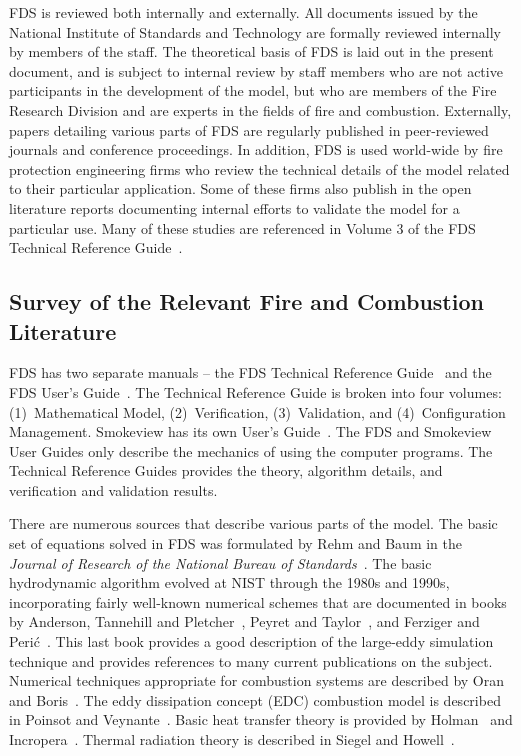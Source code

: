 \documentclass[11pt]{book}
\begin{document}
FDS is reviewed both internally and externally. All documents issued by the National Institute of Standards and Technology are formally reviewed internally by members of the staff. The theoretical basis of FDS is laid out in the present document, and is subject to internal review by staff members who are not active participants in the development of the model, but who are members of the Fire Research Division and are experts in the fields of fire and combustion. Externally, papers detailing various parts of FDS are regularly published in peer-reviewed journals and conference proceedings. In addition, FDS is used world-wide by fire protection engineering firms who review the technical details of the model related to their particular application. Some of these firms also publish in the open literature reports documenting internal efforts to validate the model for a particular use. Many of these studies are referenced in Volume 3 of the FDS Technical Reference Guide~\cite{FDS_Tech_Guide}.

\subsection{Survey of the Relevant Fire and Combustion Literature}

\label{Relevantdocs}

FDS has two separate manuals -- the FDS Technical Reference Guide~\cite{FDS_Tech_Guide} and the FDS User's Guide~\cite{FDS_Users_Guide}. The Technical Reference Guide is broken into four volumes: (1)~Mathematical Model, (2)~Verification, (3)~Validation, and (4)~Configuration Management. Smokeview has its own User's Guide~\cite{Smokeview_Users_Guide}. The FDS and Smokeview User Guides only describe the mechanics of using the computer programs. The Technical Reference Guides provides the theory, algorithm details, and verification and validation results.

There are numerous sources that describe various parts of the model. The basic set of equations solved in FDS was formulated by Rehm and Baum in the {\em Journal of Research of the National Bureau of Standards}~\cite{Rehm:1}.  The basic hydrodynamic algorithm evolved at NIST through the 1980s and 1990s, incorporating fairly well-known numerical schemes that are documented in books by Anderson, Tannehill and Pletcher~\cite{Anderson:1}, Peyret and Taylor~\cite{Peyret:1}, and Ferziger and Peri\'{c}~\cite{Ferziger:1}. This last book provides a good description of the large-eddy simulation technique and provides references to many current publications on the subject.  Numerical techniques appropriate for combustion systems are described by Oran and Boris~\cite{Oran:1}.  The eddy dissipation concept (EDC) combustion model is described in Poinsot and Veynante~\cite{Poinsot:TNC}. Basic heat transfer theory is provided by Holman~\cite{Holman:1} and Incropera~\cite{Incropera:1}. Thermal radiation theory is described in Siegel and Howell~\cite{Siegel:1}.
\end{document}
